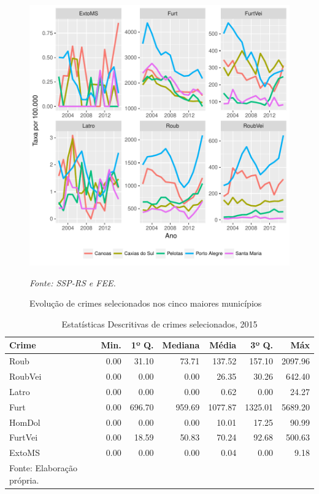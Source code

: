 \documentclass[12pt,openright,oneside,a4paper,english,french,spanish]{abntex2}
\numberwithin{table}{section} %
\numberwithin{figure}{section} %
\newcommand{\source}[1]{\textit{#1}}
\begin{document}
\begin{figure}
\begin{center}
\includegraphics{TESE_DE_DOUTORADO_RENAN_FINAL-plot6}
\end{center}
\caption{Evolução de crimes selecionados nos cinco maiores municípios}
\source{Fonte: SSP-RS e FEE.}
\label{fig:evol_crimes5}
\end{figure}

\begin{table}[H]
\caption{Estatísticas Descritivas de crimes selecionados, 2015}
\label{tab:descritivas_2015}
\centering
\begin{tabular}{lrrrrrr} %
  \hline
Crime & Min. & 1º Q. & Mediana & Média & 3º Q. & Máx \\ 
  \hline
Roub & 0.00 & 31.10 & 73.71 & 137.52 & 157.10 & 2097.96 \\ 
RoubVei & 0.00 & 0.00 & 0.00 & 26.35 & 30.26 & 642.40 \\ 
Latro & 0.00 & 0.00 & 0.00 & 0.62 & 0.00 & 24.27 \\ 
Furt & 0.00 & 696.70 & 959.69 & 1077.87 & 1325.01 & 5689.20 \\ 
HomDol & 0.00 & 0.00 & 0.00 & 10.01 & 17.25 & 90.99 \\ 
FurtVei & 0.00 & 18.59 & 50.83 & 70.24 & 92.68 & 500.63 \\ 
ExtoMS & 0.00 & 0.00 & 0.00 & 0.04 & 0.00 & 9.18 \\ 
   \hline
\tiny Fonte: Elaboração própria.
\end{tabular}
\end{table}
\end{document}
